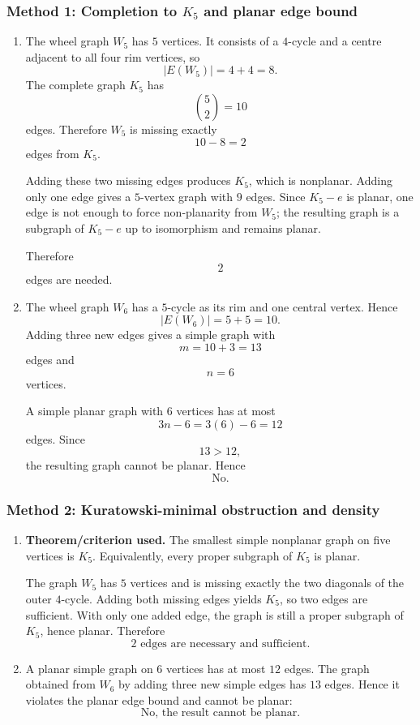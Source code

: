 \documentclass[12pt]{article}
\begin{document}
\subsubsection{Method 1: Completion to $K_5$ and planar edge bound}
\begin{enumerate}[label=(\alph*)]
  \item The wheel graph $W_5$ has $5$ vertices. It consists of a $4$-cycle and a centre adjacent to all four rim vertices, so
  \[
    |E(W_5)|=4+4=8.
  \]
  The complete graph $K_5$ has
  \[
    \binom{5}{2}=10
  \]
  edges. Therefore $W_5$ is missing exactly
  \[
    10-8=2
  \]
  edges from $K_5$.

  Adding these two missing edges produces $K_5$, which is nonplanar. Adding only one edge gives a $5$-vertex graph with $9$ edges. Since $K_5-e$ is planar, one edge is not enough to force non-planarity from $W_5$; the resulting graph is a subgraph of $K_5-e$ up to isomorphism and remains planar.

  Therefore
  \[
    \boxed{2}
  \]
  edges are needed.

  \item The wheel graph $W_6$ has a $5$-cycle as its rim and one central vertex. Hence
  \[
    |E(W_6)|=5+5=10.
  \]
  Adding three new edges gives a simple graph with
  \[
    m=10+3=13
  \]
  edges and
  \[
    n=6
  \]
  vertices.

  A simple planar graph with $6$ vertices has at most
  \[
    3n-6=3(6)-6=12
  \]
  edges. Since
  \[
    13>12,
  \]
  the resulting graph cannot be planar. Hence
  \[
    \boxed{\text{No}.}
  \]
\end{enumerate}

\subsubsection{Method 2: Kuratowski-minimal obstruction and density}
\begin{enumerate}[label=(\alph*)]
  \item \textbf{Theorem/criterion used.} The smallest simple nonplanar graph on five vertices is $K_5$. Equivalently, every proper subgraph of $K_5$ is planar.

  The graph $W_5$ has $5$ vertices and is missing exactly the two diagonals of the outer $4$-cycle. Adding both missing edges yields $K_5$, so two edges are sufficient. With only one added edge, the graph is still a proper subgraph of $K_5$, hence planar. Therefore
  \[
    \boxed{2\text{ edges are necessary and sufficient}.}
  \]

  \item A planar simple graph on $6$ vertices has at most $12$ edges. The graph obtained from $W_6$ by adding three new simple edges has $13$ edges. Hence it violates the planar edge bound and cannot be planar:
  \[
    \boxed{\text{No, the result cannot be planar}.}
  \]
\end{enumerate}
\end{document}
